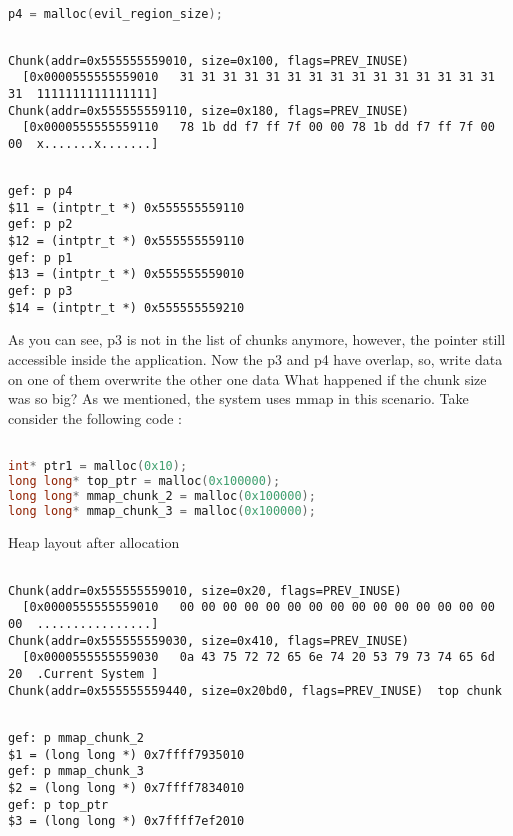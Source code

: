 \documentclass{masterthesis}
\begin{document}
\begin{lstlisting}[language=c,frame=tlrb]
p4 = malloc(evil_region_size);
 \end{lstlisting}

\begin{lstlisting}[frame=tlrb]

Chunk(addr=0x555555559010, size=0x100, flags=PREV_INUSE)
  [0x0000555555559010   31 31 31 31 31 31 31 31 31 31 31 31 31 31 31 31  1111111111111111]
Chunk(addr=0x555555559110, size=0x180, flags=PREV_INUSE)
  [0x0000555555559110   78 1b dd f7 ff 7f 00 00 78 1b dd f7 ff 7f 00 00  x.......x.......]
 \end{lstlisting}

\begin{lstlisting}[frame=tlrb]

gef: p p4
$11 = (intptr_t *) 0x555555559110
gef: p p2
$12 = (intptr_t *) 0x555555559110
gef: p p1
$13 = (intptr_t *) 0x555555559010
gef: p p3
$14 = (intptr_t *) 0x555555559210
 \end{lstlisting}
As you can see, p3 is not in the list of chunks anymore, however, the pointer still accessible inside the application. Now the p3 and p4 have overlap, so, write data on one of them overwrite the other one data
What happened if the chunk size was so big? As we mentioned, the system uses mmap in this scenario. Take consider the following code : 

\begin{lstlisting}[language=c,frame=tlrb]

int* ptr1 = malloc(0x10);
long long* top_ptr = malloc(0x100000);
long long* mmap_chunk_2 = malloc(0x100000);
long long* mmap_chunk_3 = malloc(0x100000);
 \end{lstlisting}
Heap layout after allocation 

\begin{lstlisting}[frame=tlrb]

Chunk(addr=0x555555559010, size=0x20, flags=PREV_INUSE)
  [0x0000555555559010   00 00 00 00 00 00 00 00 00 00 00 00 00 00 00 00  ................]
Chunk(addr=0x555555559030, size=0x410, flags=PREV_INUSE)
  [0x0000555555559030   0a 43 75 72 72 65 6e 74 20 53 79 73 74 65 6d 20  .Current System ]
Chunk(addr=0x555555559440, size=0x20bd0, flags=PREV_INUSE)  top chunk
 \end{lstlisting}

\begin{lstlisting}[frame=tlrb]

gef: p mmap_chunk_2
$1 = (long long *) 0x7ffff7935010
gef: p mmap_chunk_3
$2 = (long long *) 0x7ffff7834010
gef: p top_ptr
$3 = (long long *) 0x7ffff7ef2010
 \end{lstlisting}
\end{document}
